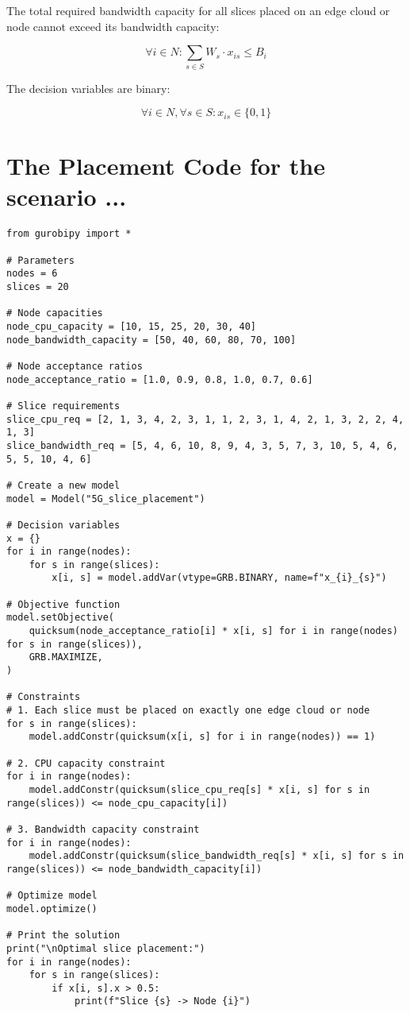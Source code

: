 The total required bandwidth capacity for all slices placed on an edge cloud or node cannot exceed its bandwidth capacity:

\begin{equation*}
    \forall i \in N: \sum_{s \in S} W_s \cdot x_{is} \leq B_i
\end{equation*}

The decision variables are binary:

\begin{equation*}
    \forall i \in N, \forall s \in S: x_{is} \in \{0, 1\}
\end{equation*}

\section*{The Placement Code for the scenario ...}

\begin{lstlisting}
from gurobipy import *

# Parameters
nodes = 6
slices = 20

# Node capacities
node_cpu_capacity = [10, 15, 25, 20, 30, 40]
node_bandwidth_capacity = [50, 40, 60, 80, 70, 100]

# Node acceptance ratios
node_acceptance_ratio = [1.0, 0.9, 0.8, 1.0, 0.7, 0.6]

# Slice requirements
slice_cpu_req = [2, 1, 3, 4, 2, 3, 1, 1, 2, 3, 1, 4, 2, 1, 3, 2, 2, 4, 1, 3]
slice_bandwidth_req = [5, 4, 6, 10, 8, 9, 4, 3, 5, 7, 3, 10, 5, 4, 6, 5, 5, 10, 4, 6]

# Create a new model
model = Model("5G_slice_placement")

# Decision variables
x = {}
for i in range(nodes):
    for s in range(slices):
        x[i, s] = model.addVar(vtype=GRB.BINARY, name=f"x_{i}_{s}")

# Objective function
model.setObjective(
    quicksum(node_acceptance_ratio[i] * x[i, s] for i in range(nodes) for s in range(slices)),
    GRB.MAXIMIZE,
)

# Constraints
# 1. Each slice must be placed on exactly one edge cloud or node
for s in range(slices):
    model.addConstr(quicksum(x[i, s] for i in range(nodes)) == 1)

# 2. CPU capacity constraint
for i in range(nodes):
    model.addConstr(quicksum(slice_cpu_req[s] * x[i, s] for s in range(slices)) <= node_cpu_capacity[i])

# 3. Bandwidth capacity constraint
for i in range(nodes):
    model.addConstr(quicksum(slice_bandwidth_req[s] * x[i, s] for s in range(slices)) <= node_bandwidth_capacity[i])

# Optimize model
model.optimize()

# Print the solution
print("\nOptimal slice placement:")
for i in range(nodes):
    for s in range(slices):
        if x[i, s].x > 0.5:
            print(f"Slice {s} -> Node {i}")
\end{lstlisting}

